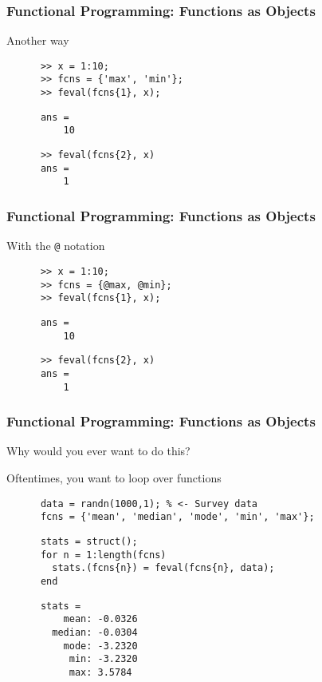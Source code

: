 \documentclass{beamer}
\begin{document}
  \begin{frame}[fragile]
    \frametitle{Functional Programming: Functions as Objects}

    Another way
    \begin{lstlisting}
      >> x = 1:10;
      >> fcns = {'max', 'min'};
      >> feval(fcns{1}, x);
      \end{lstlisting}\pause
      \vspace{-12pt}
      \begin{lstlisting}
      ans =
          10
      \end{lstlisting}\pause
      \vspace{-12pt}
      \begin{lstlisting}
      >> feval(fcns{2}, x)
      ans =
          1
    \end{lstlisting}
	\end{frame}

  \begin{frame}[fragile]
    \frametitle{Functional Programming: Functions as Objects}

    With the \texttt{@} notation
    \begin{lstlisting}
      >> x = 1:10;
      >> fcns = {@max, @min};
      >> feval(fcns{1}, x);
      \end{lstlisting}
      \vspace{-12pt}
      \begin{lstlisting}
      ans =
          10
      \end{lstlisting}
      \vspace{-12pt}
      \begin{lstlisting}
      >> feval(fcns{2}, x)
      ans =
          1
    \end{lstlisting}
	\end{frame}


  \begin{frame}[fragile]
    \frametitle{Functional Programming: Functions as Objects}

    Why would you ever want to do this?\pause
    \vspace{10pt}

    Oftentimes, you want to loop over functions
    \begin{lstlisting}
      data = randn(1000,1); % <- Survey data
      fcns = {'mean', 'median', 'mode', 'min', 'max'};
    \end{lstlisting}\pause
    \begin{lstlisting}
      stats = struct();
      for n = 1:length(fcns)
        stats.(fcns{n}) = feval(fcns{n}, data);
      end
      \end{lstlisting}\pause
      \lstset{style=matlabNoBlue}
      \begin{lstlisting}
      stats =
          mean: -0.0326
        median: -0.0304
          mode: -3.2320
           min: -3.2320
           max: 3.5784
    \end{lstlisting}
    \lstset{style=matlab}
	\end{frame}
\end{document}
